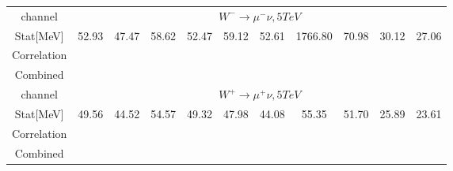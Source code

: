 \documentclass[12pt]{article}
\begin{document}
\begin{table}[]
{\begin{tabular}{ccccccccccc}
channel                & \multicolumn{10}{c}{$W^{-}\rightarrow \mu^{-}\nu,   5TeV$}                                                                                                                     \\         
Stat{[}MeV{]}          &       52.93     &      47.47     &      58.62       &    52.47        &       59.12      &    52.61        &  1766.80           &  70.98          &     30.12       &   27.06        \\         
Correlation            & \multicolumn{2}{c}{}             & \multicolumn{2}{c}{}               & \multicolumn{2}{c}{}               & \multicolumn{2}{c}{}               & \multicolumn{2}{c}{}             \\         
Combined               & \multicolumn{2}{c}{}             & \multicolumn{2}{c}{}               & \multicolumn{2}{c}{}               & \multicolumn{2}{c}{}               & \multicolumn{2}{c}{}             \\ \hline \hline 
channel                & \multicolumn{10}{c}{$W^{+}\rightarrow \mu^{+}\nu,   5TeV$}                                                                                                                      \\         
Stat{[}MeV{]}          &       49.56     &      44.52     &      54.57       &    49.32        &       47.98      &    44.08        &  55.35           &  51.70          &     25.89       &   23.61        \\         
Correlation            & \multicolumn{2}{c}{}             & \multicolumn{2}{c}{}               & \multicolumn{2}{c}{}               & \multicolumn{2}{c}{}               & \multicolumn{2}{c}{}             \\         
Combined               & \multicolumn{2}{c}{}             & \multicolumn{2}{c}{}               & \multicolumn{2}{c}{}               & \multicolumn{2}{c}{}               & \multicolumn{2}{c}{}             \\ \hline \hline 
\end{tabular}
}
\end{table}
\end{document}
